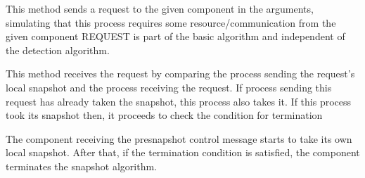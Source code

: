 \documentclass[letterpaper,10pt,english]{sphinxmanual}
\begin{document}
\begin{fulllineitems}
\begin{fulllineitems}
\end{fulllineitems}


\begin{fulllineitems}
\label{\detokenize{docs/BrachaToueg/generated/BrachaToueg.BrachaToueg:BrachaToueg.BrachaToueg.BrachaTouegComponentModel.send_request_to_component}}
\pysigstartsignatures
{}
\pysigstopsignatures
\sphinxAtStartPar
This method sends a request to the given component in the arguments, simulating
that this process requires some resource/communication from the given component
REQUEST is part of the basic algorithm and independent of the detection algorithm.

\end{fulllineitems}


\begin{fulllineitems}
\label{\detokenize{docs/BrachaToueg/generated/BrachaToueg.BrachaToueg:BrachaToueg.BrachaToueg.BrachaTouegComponentModel.on_receiving_request_from_component}}
\pysigstartsignatures
{}
\pysigstopsignatures
\sphinxAtStartPar
This method receives the request by comparing the process sending the request’s local snapshot and the process receiving
the request. If process sending this request has already taken the snapshot, this process also takes it. If this process
took its snapshot then, it proceeds to check the condition for termination

\end{fulllineitems}


\begin{fulllineitems}
\label{\detokenize{docs/BrachaToueg/generated/BrachaToueg.BrachaToueg:BrachaToueg.BrachaToueg.BrachaTouegComponentModel.on_receiving_presnapshot}}
\pysigstartsignatures
{}
\pysigstopsignatures
\sphinxAtStartPar
The component receiving the presnapshot control message starts to take its own local snapshot.
After that, if the termination condition is satisfied, the component terminates the snapshot algorithm.


\end{fulllineitems}
\end{fulllineitems}
\end{document}
